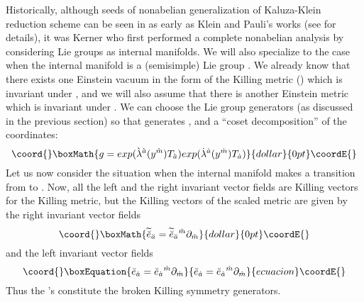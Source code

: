 \documentclass[a4paper,12pt]{article}
\begin{document}
Historically, although seeds of nonabelian generalization of Kaluza-Klein reduction scheme can be seen in as early as Klein and Pauli's works (see \cite{dawn,kaluza} for details), it was Kerner \cite{kerner} who first performed a complete nonabelian analysis by considering  Lie groups as internal manifolds. We will also specialize to the case when the internal manifold is a (semisimple) Lie group \coordHE{}. We already  know that there exists one Einstein vacuum in the form of the Killing metric (\coordHE{}) which is invariant under \coordHE{}, and we will also assume that there is another Einstein metric \coordHE{} which is  invariant under \coordHE{}. We can choose the Lie group generators \coordHE{} (as discussed in the previous section) so that \coordHE{} generates \coordHE{}, and a ``coset decomposition'' of the coordinates:
$$\coord{}\boxMath{g=exp(\grave{\la}^{\az}(y^{\mz})T_{\az}) exp(\dot{\la}^{\ad}(y^{\md})T_{\ad})}{dollar}{0pt}\coordE{}$$
Let us now consider the situation when the internal manifold makes a transition from \coordHE{} to \coordHE{}. Now, all the left and the right invariant vector fields are  Killing vectors for the Killing metric, but the Killing vectors of the scaled metric are given by the right invariant vector fields 
$$\coord{}\boxMath{\ti{\es}_{\as}=\ti{\es}_{\as}{}^{\ms}\p_{\ms}}{dollar}{0pt}\coordE{}$$
and the left invariant vector fields 
\begin{equation}\coord{}\boxEquation{
\es_{\ad}=\es_{\ad}{}^{\md}\p_{\md}
}{
\es_{\ad}=\es_{\ad}{}^{\md}\p_{\md}
}{ecuacion}\coordE{}\end{equation}
Thus the \myHighlight{$\es_{\az}$}\coordHE{}'s constitute the broken Killing symmetry generators.
 \vspace{5mm}
\\ 
\end{document}
